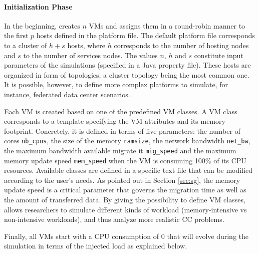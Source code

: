 \paragraph{Initialization Phase}
In the beginning, \vmps creates $n$ VMs and assigns them in a
round-robin manner to the first $p$ hosts defined in the platform
file.  The default platform file corresponds to a cluster of $h+s$
hosts, where $h$ corresponds to the number of hosting nodes and $s$ to
the number of services nodes. The values $n$, $h$ and $s$ constitute
input parameters of the simulations (specified in a Java property
file).
These hosts are organized in form of topologies, a cluster topology
being the most common one. It is possible, however, to define more
complex platforms to simulate, for instance, federated data center scenarios.

Each VM is created based on one of the predefined VM classes. A VM
class corresponds to a template specifying the VM attributes and its
memory footprint. Concretely, it is
defined in terms of five parameters: the number of cores
\texttt{nb\_cpus}, the size of the memory \texttt{ramsize}, the
network bandwidth \texttt{net\_bw}, the maximum bandwidth available
migrate it \texttt{mig\_speed} and the maximum memory update speed
\texttt{mem\_speed} when the VM is consuming 100\% of its CPU
resources.
Available classes
are defined in a specific text file that can be modified according to
the user's needs.
As pointed out in Section \ref{sec:sg}, the memory update
speed is a critical parameter that governs the migration time as well
as the amount of transferred data.
By giving the possibility to define
VM classes, \vmps allows researchers to simulate different kinds of
workload (\ie memory-intensive vs non-intensive workloads), and thus
analyze more realistic CC problems.

%
Finally, all VMs start with a CPU consumption of 0 that will evolve
during the simulation in terms of the injected load as explained
below.

